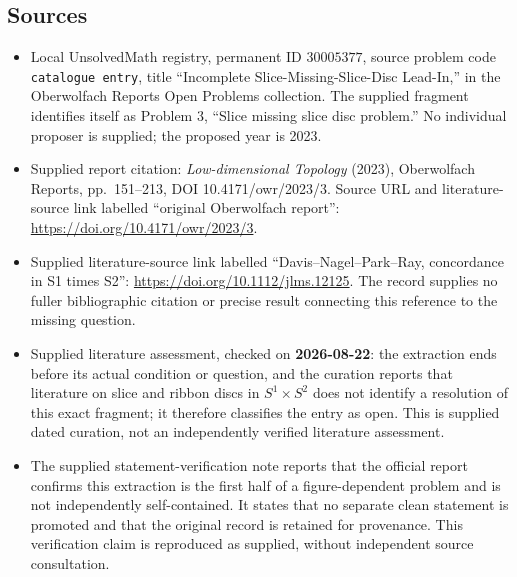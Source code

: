 \documentclass[11pt]{article}
\begin{document}
\subsection{Sources}
\begin{itemize}
\item Local UnsolvedMath registry, permanent ID \(30005377\), source problem code \texttt{catalogue entry}, title ``Incomplete Slice-Missing-Slice-Disc Lead-In,'' in the Oberwolfach Reports Open Problems collection. The supplied fragment identifies itself as Problem 3, ``Slice missing slice disc problem.'' No individual proposer is supplied; the proposed year is 2023.
\item Supplied report citation: \emph{Low-dimensional Topology} (2023), Oberwolfach Reports, pp.~151--213, DOI 10.4171/owr/2023/3. Source URL and literature-source link labelled ``original Oberwolfach report'': \url{https://doi.org/10.4171/owr/2023/3}.
\item Supplied literature-source link labelled ``Davis--Nagel--Park--Ray, concordance in S1 times S2'': \url{https://doi.org/10.1112/jlms.12125}. The record supplies no fuller bibliographic citation or precise result connecting this reference to the missing question.
\item Supplied literature assessment, checked on \textbf{2026-08-22}: the extraction ends before its actual condition or question, and the curation reports that literature on slice and ribbon discs in \(S^1\times S^2\) does not identify a resolution of this exact fragment; it therefore classifies the entry as open. This is supplied dated curation, not an independently verified literature assessment.
\item The supplied statement-verification note reports that the official report confirms this extraction is the first half of a figure-dependent problem and is not independently self-contained. It states that no separate clean statement is promoted and that the original record is retained for provenance. This verification claim is reproduced as supplied, without independent source consultation.
\end{itemize}
\end{document}
